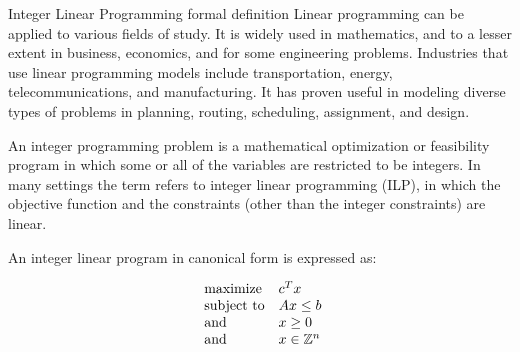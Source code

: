 \documentclass[9pt]{extarticle}
\begin{document}
\begin{section}{Integer Linear Programming formal definition}
        Linear programming can be applied to various fields of study. 
        It is widely used in mathematics, and to a lesser extent in business, economics, and for some engineering problems. 
        Industries that use linear programming models include transportation, energy, telecommunications, and manufacturing. 
        It has proven useful in modeling diverse types of problems in planning, routing, scheduling, assignment, and design.
        \cite{wiki:lp}

        An integer programming problem is a mathematical optimization or feasibility program in which some or all of the 
        variables are restricted to be integers. 
        In many settings the term refers to integer linear programming (ILP), in which the objective function and the 
        constraints (other than the integer constraints) are linear.

        An integer linear program in canonical form is expressed as:

        \begin{equation*}
            \begin{array}{ll@{}ll}
                \text{maximize}  & c^{T}x \\
                \text{subject to}& Ax \leq b \\
                \text{and} & x \ge 0 \\
                \text{and} & x \in \mathbb{Z}^n \\
            \end{array}
        \end{equation*}

    \end{section}
\end{document}
